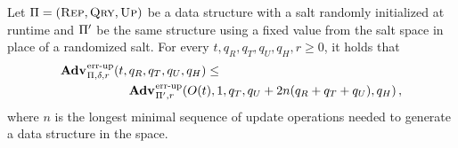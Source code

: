 \begin{lemma}\label{lemma:noinvsalt}
  Let $\mathrm{\Pi} = (\textnormal{\textsc{Rep}}, \textnormal{\textsc{Qry}}, \textnormal{\textsc{Up}})$ be a data structure with a salt randomly
  initialized at runtime and $\mathrm{\Pi}'$ be the same structure using a fixed
  value from the salt space in place of a randomized salt. For every $t, q_R,
  q_T, q_U, q_H, r\geq 0$, it holds that
  \begin{equation*}
    \begin{aligned}
    \Adv{\errep}_{\struct,\delta,r}(t,\,&q_R, q_T, q_U, q_H) \leq \\
      & \Adv{\errep}_{\struct',r}(O(t), 1, q_T, q_U+2n(q_R+q_T+q_U), q_H) \,,
    \end{aligned}
  \end{equation*}
  where $n$ is the longest minimal sequence of update operations needed to
  generate a data structure in the space.
\end{lemma}
